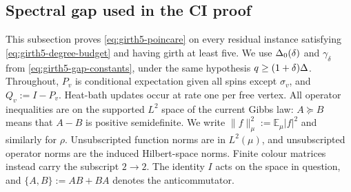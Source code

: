 \subsection{Spectral gap used in the CI proof}
\label{sec:fixed-girth-ci}\label{app:fixed-girth-ci}

This subsection proves \eqref{eq:girth5-poincare} on every residual instance
satisfying \eqref{eq:girth5-degree-budget} and having girth at least five.
We use $\Delta_0(\delta)$ and $\gamma_\delta$ from
\eqref{eq:girth5-gap-constants}, under the same hypothesis
$q\ge(1+\delta)\Delta$.  Throughout, $P_v$
is conditional expectation given all spins except $\sigma_v$, and
$Q_v:=I-P_v$.  Heat-bath updates occur at rate one per free vertex.
All operator inequalities are on the supported $L^2$ space of the current
Gibbs law: $A\succeq B$ means that $A-B$ is positive semidefinite.
We write $\|f\|_\mu^2:=\mathbb E_\mu|f|^2$ and similarly for $\rho$.
Unsubscripted function norms are in $L^2(\mu)$, and unsubscripted operator
norms are the induced Hilbert-space norms.  Finite colour matrices instead
carry the subscript $2\to2$.  The identity $I$ acts on the space in
question, and $\{A,B\}:=AB+BA$ denotes the anticommutator.

